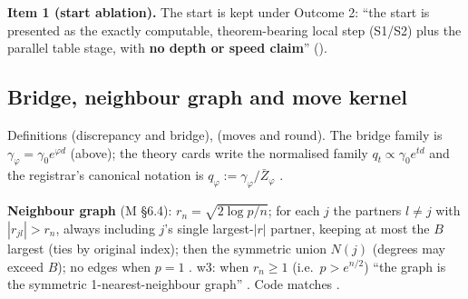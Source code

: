 \textbf{Item 1 (start ablation).} The start is kept under Outcome 2: ``the start is presented as the exactly computable,
theorem-bearing local step (S1/S2) plus the parallel table stage, with \textbf{no depth or speed claim}''
 ().

\subsection{Bridge, neighbour graph and move kernel}\label{sec:method-kernel}

Definitions  (discrepancy and bridge),  (moves and round). The bridge family is
$\gamma_\varphi=\gamma_0e^{\varphi d}$ (above); the theory cards write the normalised family $q_t\propto\gamma_0e^{td}$
 and the registrar's canonical notation is
$q_\varphi:=\gamma_\varphi/\bar Z_\varphi$ .

\textbf{Neighbour graph} (M \S6.4): $r_n=\sqrt{2\log p/n}$; for each $j$ the partners $l\ne j$ with $|r_{jl}|>r_n$, always
including $j$'s single largest-$|r|$ partner, keeping at most the $B$ largest (ties by original index); then the symmetric
union $N(j)$ (degrees may exceed $B$); no edges when $p=1$ . w3: when
$r_n\ge1$ (i.e.\ $p>e^{n/2}$) ``the graph is the symmetric 1-nearest-neighbour graph''
. Code matches
.

